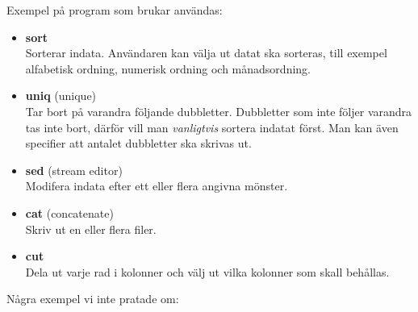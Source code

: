 \documentclass[12pt,a4paper]{article}
\begin{document}
Exempel på program som brukar användas:
\newpage
\begin{itemize}
\item \textbf{sort}\\
Sorterar indata. Användaren kan välja ut datat
ska sorteras, till exempel alfabetisk ordning,
numerisk ordning och månadsordning.
\item \textbf{uniq} (unique)\\
Tar bort på varandra följande dubbletter.
Dubbletter som inte följer varandra tas inte bort,
därför vill man \emph{vanligtvis} sortera indatat
först. Man kan även specifier att antalet dubbletter
ska skrivas ut.
\item \textbf{sed} (stream editor)\\
Modifera indata efter ett eller flera angivna mönster.
\item \textbf{cat} (concatenate)\\
Skriv ut en eller flera filer.
\item \textbf{cut}\\
Dela ut varje rad i kolonner och välj ut vilka kolonner
som skall behållas.
\end{itemize}
Några exempel vi inte pratade om:
\end{document}
